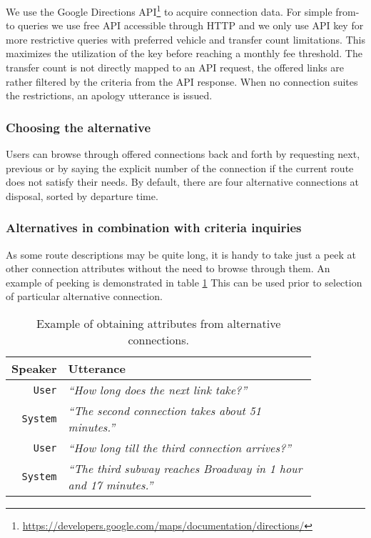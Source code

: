We use the Google Directions API\footnote{\url{https://developers.google.com/maps/documentation/directions/}} to acquire connection data.
For simple from-to queries we use free API accessible through HTTP and we only use API key for more restrictive queries with preferred vehicle and transfer count limitations.
This maximizes the utilization of the key before reaching a monthly fee threshold.
The transfer count is not directly mapped to an API request, the offered links are rather filtered by the criteria from the API response.
When no connection suites the restrictions, an apology utterance is issued.

\subsubsection{Choosing the alternative}

Users can browse through offered connections back and forth by requesting next, previous or by saying the explicit number of the connection if the current route does not satisfy their needs.
By default, there are four alternative connections at disposal, sorted by departure time.


\subsubsection{Alternatives in combination with criteria inquiries}

As some route descriptions may be quite long, it is handy to take just a peek at other connection attributes without the need to browse through them.
An example of peeking is demonstrated in table \ref{table:peek}
This can be used prior to selection of particular alternative connection.

\begin{table}[h]
\centering
\begin{tabular}{ | r | p{0.85\linewidth} | } \hline
	Speaker & Utterance \\ \hline
	\texttt{User} & \textit{``How long does the next link take?''} \\ \hline
	\texttt{System} & \textit{``The second connection takes about 51 minutes.''} \\ \hline
	\texttt{User} & \textit{``How long till the third connection arrives?''} \\ \hline
	\texttt{System} & \textit{``The third subway reaches Broadway in 1 hour and 17 minutes.''} \\ \hline
\end{tabular}
\caption[Alternative attribute peek]{Example of obtaining attributes from alternative connections.}
\label{table:peek}
\end{table}


